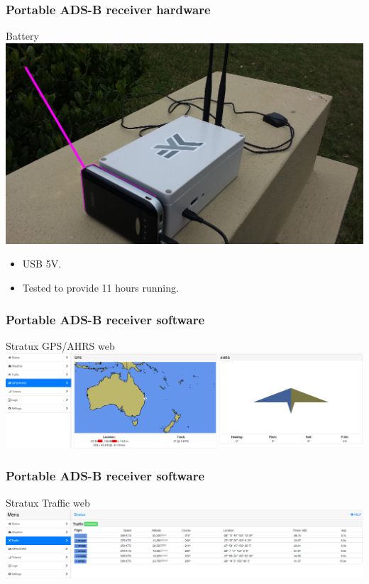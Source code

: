 \begin{frame}
\frametitle{Portable ADS-B receiver hardware}
\begin{block}{Battery}
\includegraphics[height=0.5\textheight]{image/adsb-hardware-battery.png}
\begin{itemize}
\item USB 5V.
\item Tested to provide 11 hours running.
\end{itemize}
\end{block}
\end{frame}

\begin{frame}
\frametitle{Portable ADS-B receiver software}
\begin{block}{Stratux GPS/AHRS web}
\includegraphics[height=0.32\textheight]{image/stratux-gps-ahrs-web.png}
\end{block}
\end{frame}

\begin{frame}
\frametitle{Portable ADS-B receiver software}
\begin{block}{Stratux Traffic web}
\includegraphics[height=0.23\textheight]{image/stratux-traffic-web.png}
\end{block}
\end{frame}


